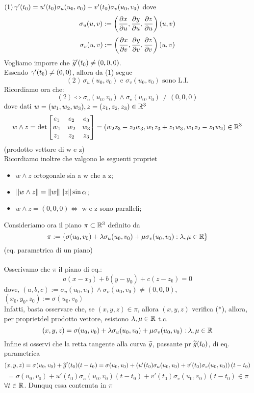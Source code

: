 \begin{exercise}
  $(1) \, \gamma'(t_0) = u'(t_0)\sigma_u(u_0,v_0) + v'(t_0)\sigma_v(u_0,v_0)$
  dove 
  $$\sigma_u(u,v) := \left(\frac{\partial x}{\partial u}, \frac{\partial y}{\partial u}, \frac{\partial z}{\partial u}\right)(u,v)$$
  $$\sigma_v(u,v) := \left(\frac{\partial x}{\partial v}, \frac{\partial y}{\partial v}, \frac{\partial z}{\partial v}\right)(u,v)$$
  Vogliamo imporre che $\widetilde{g}'(t_0)\neq(0,0,0)$. \\
  Essendo $\gamma'(t_0) \neq (0,0)$, allora da (1) segue 
  $$(2) \, \sigma_u(u_0,v_0) \text{ e } \sigma_v(u_0,v_0) \text{ sono L.I.}$$
  Ricordiamo ora che:
  $$(2) \iff \sigma_u(u_0,v_0)\wedge\sigma_v(u_0,v_0)\neq(0,0,0)$$
  dove dati $w=(w_1,w_2,w_3), z = (z_1,z_2,z_3) \in \mathbb{R}^3$
  $$w\wedge z = \det\begin{bmatrix}
    e_1 & e_2 & e_3 \\
    w_1 & w_2 & w_3 \\
    z_1 & z_2 & z_3 \\
  \end{bmatrix} = \left(w_2z_3 - z_2w_3, w_1z_3+z_1w_3, w_1z_2-z_1w_2\right) \in \mathbb{R}^3$$ 
  (prodotto vettore di w e z) \\
  Ricordiamo inoltre che valgono le seguenti propriet\aca
  \begin{itemize}
    \item $w\wedge z$ \ace ortogonale sia a w che a z;
    \item $\left\lVert w\wedge z\right\rVert = \left\lVert w\right\rVert\left\lVert z\right\rVert\sin{\alpha}$;
    \item $w\wedge z = (0,0,0) \iff$ w e z sono paralleli;
  \end{itemize}
  Consideriamo ora il piano $\pi \subset \mathbb{R}^3$ definito da 
  $$\pi := \{\sigma(u_0,v_0) + \lambda \sigma_u(u_0,v_0) + \mu \sigma_v(u_0,v_0) : \lambda, \mu \in \mathbb{R}\}$$
  (eq. parametrica di un piano) \\\\
  Osserivamo che $\pi$ \ace il piano di eq.:
  $$a(x-x_0)+b(y-y_0)+c(z-z_0) = 0$$
  dove, $(a,b,c) := \sigma_u(u_0,v_0) \wedge \sigma_v(u_0,v_0) \neq (0,0,0)$, 
  $(x_0,y_0,z_0 ):= \sigma(u_0,v_0)$ \\
  Infatti, basta osservare che, se $(x,y,z)\in \pi$, allora $(x,y,z)$
  verifica (*), allora, per propriet\aca del prodotto vettore, esistono
  $\lambda,\mu \in \mathbb{R}$ t.c. 
  $$(x,y,z) = \sigma(u_0,v_0) + \lambda \sigma_u(u_0,v_0) + \mu \sigma_v(u_0,v_0) : \lambda, \mu \in \mathbb{R}$$
  Infine si osservi che la retta tangente alla curva $\widetilde{g}$, passante pr 
  $\widetilde{g}(t_0)$, di eq. parametrica 
  $$(x,y,z) = \sigma(u_0,v_0) + \widetilde{g}'(t_0)(t-t_0) = 
      \sigma(u_0,v_0) + \left(u'(t_0)\sigma_u(u_0,v_0) + v'(t_0)\sigma_v(u_0,v_0)\right)(t-t_0)$$
  $$= \sigma(u_0,v_0) + u'(t_0)\sigma_u(u_0,v_0)(t-t_0) + v'(t_0)\sigma_v(u_0,v_0)(t-t_0) \in \pi$$
  $\forall t \in \mathbb{R}$. Dunquq essa \ace contenuta in $\pi$
\end{exercise}
